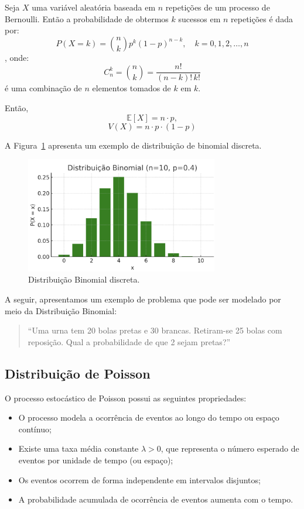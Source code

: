 \documentclass{article}
\begin{document}
Seja $X$ uma variável aleatória baseada em $n$ repetições de um processo de Bernoulli.  
Então a probabilidade de obtermos $k$ sucessos em $n$ repetições é dada por:
    $$
    P(X = k) = \binom{n}{k} p^k (1 - p)^{n - k}, \quad k = 0, 1, 2, \ldots, n
    $$,
onde:
    $$
    C_n^k = \binom{n}{k} = \frac{n!}{(n - k)! \, k!}
    $$
é uma combinação de $n$ elementos tomados de $k$ em $k$.

Então,
    $$
    \mathbb{E}[X] = n \cdot p,
    $$
    $$
    V(X) = n \cdot p \cdot (1-p)
    $$

A Figura~\ref{fig:dist_disc_binomial} apresenta um exemplo de distribuição de binomial discreta.

\begin{figure}[H]
    \centering
    \includegraphics[width=0.75\textwidth]{figuras/dist_disc_binomial.png}
    \caption{Distribuição Binomial discreta.}
    \label{fig:dist_disc_binomial}
\end{figure}

A seguir, apresentamos um exemplo de problema que pode ser modelado por meio da Distribuição Binomial:
\begin{quote}
``Uma urna tem 20 bolas pretas e 30 brancas. Retiram-se 25 bolas com reposição. Qual a probabilidade de que 2 sejam pretas?''
\end{quote}

\subsection{Distribuição de Poisson}
O processo estocástico de Poisson possui as seguintes propriedades:
\begin{itemize}
    \item O processo modela a ocorrência de eventos ao longo do tempo ou espaço contínuo;
    \item Existe uma taxa média constante $\lambda > 0$, que representa o número esperado de eventos por unidade de tempo (ou espaço);
    \item Os eventos ocorrem de forma independente em intervalos disjuntos;
    \item A probabilidade acumulada de ocorrência de eventos aumenta com o tempo.
\end{itemize}
\end{document}
